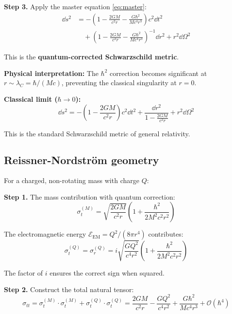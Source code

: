 \documentclass[11pt,a4paper]{article}
\theoremstyle{definition}
\theoremstyle{remark}
\begin{document}
	\textbf{Step 3.} Apply the master equation \eqref{eq:master}:
	\begin{equation}
		\boxed{\begin{aligned}
				\dd s^2 &= -\left(1 - \frac{2GM}{c^2 r} - \frac{G\hbar^2}{Mc^4 r^3}\right)c^2 \dd t^2 \\[4pt]
				&\quad + \left(1 - \frac{2GM}{c^2 r} - \frac{G\hbar^2}{Mc^4 r^3}\right)^{-1}\dd r^2 + r^2 \dd\Omega^2
		\end{aligned}}
		\label{eq:schwarzschild_qgd}
	\end{equation}
	
	This is the \textbf{quantum-corrected Schwarzschild metric}.
	
	\textbf{Physical interpretation:} The $\hbar^2$ correction becomes significant at $r \sim \lambda_C = \hbar/(Mc)$, preventing the classical singularity at $r = 0$.
	
	\textbf{Classical limit ($\hbar \to 0$):}
	\begin{equation}
		\dd s^2 = -\left(1 - \frac{2GM}{c^2 r}\right)c^2 \dd t^2 + \frac{\dd r^2}{1 - \frac{2GM}{c^2 r}} + r^2 \dd\Omega^2
		\label{eq:schwarzschild_classical}
	\end{equation}
	
	This is the standard Schwarzschild metric of general relativity.
	
	\subsection{Reissner-Nordström geometry}
	
	For a charged, non-rotating mass with charge $Q$:
	
	\textbf{Step 1.} The mass contribution with quantum correction:
	\begin{equation}
		\sigma^{(M)}_t = \sqrt{\frac{2GM}{c^2 r}}\left(1 + \frac{\hbar^2}{2M^2 c^2 r^2}\right)
		\label{eq:sigma_mass_rn}
	\end{equation}
	
	The electromagnetic energy $\mathcal{E}_{\text{EM}} = Q^2/(8\pi r^4)$ contributes:
	\begin{equation}
		\sigma^{(Q)}_t = \sigma^{(Q)}_r = i\sqrt{\frac{GQ^2}{c^4 r^2}}\left(1 + \frac{\hbar^2}{2M^2 c^2 r^2}\right)
		\label{eq:sigma_em_rn}
	\end{equation}
	
	The factor of $i$ ensures the correct sign when squared.
	
	\textbf{Step 2.} Construct the total natural tensor:
	\begin{equation}
		\sigma_{tt} = \sigma^{(M)}_t \cdot \sigma^{(M)}_t + \sigma^{(Q)}_t \cdot \sigma^{(Q)}_t = \frac{2GM}{c^2 r} - \frac{GQ^2}{c^4 r^2} + \frac{G\hbar^2}{Mc^4 r^3} + \mathcal{O}(\hbar^4)
		\label{eq:sigma_tt_rn}
	\end{equation}
	
\end{document}

